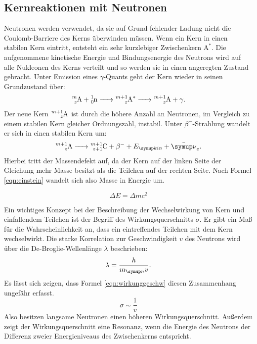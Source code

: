 \subsection{Kernreaktionen mit Neutronen}

Neutronen werden verwendet, da sie auf Grund fehlender Ladung nicht
die Coulomb-Barriere des Kerns überwinden müssen.
Wenn ein Kern in einen stabilen Kern eintritt, entsteht ein sehr kurzlebiger
Zwischenkern $\text{A}^*$. Die aufgenommene kinetische Energie und Bindungsenergie
des Neutrons wird auf alle Nukleonen des Kerns verteilt und so werden sie in
einen angeregten Zustand gebracht. Unter Emission eines $\gamma$-Quants
geht der Kern wieder in seinen Grundzustand über:
\begin{equation*}
  \ce{^{m}_zA + ^1_0n -> ^{m+1}_zA^* -> ^{m+1}_zA + \gamma}.
\end{equation*}
Der neue Kern $\ce{^{m+1}_zA}$ ist durch die höhere Anzahl an Neutronen, im Vergleich
zu einem stabilen Kern gleicher Ordnungszahl, instabil. Unter $\beta^-$-Strahlung
wandelt er sich in einen stabilen Kern um:
\begin{equation*}
  \ce{^{m+1}_zA -> ^{m+1}_{z+1}C + \beta^-} + E_{\g{kin}} + \bar{\g{\nu}}_e.
\end{equation*}
Hierbei tritt der Massendefekt auf, da der Kern auf der linken Seite der Gleichung
mehr Masse besitzt als die Teilchen auf der rechten Seite. Nach Formel \eqref{eqn:einstein}
wandelt sich also Masse in Energie um.

\begin{equation}
  \Delta E = \Delta m c^2
  \label{eqn:einstein}
\end{equation}

Ein wichtiges Konzept bei der Beschreibung der Wechselwirkung von Kern und
einfallendem Teilchen ist der Begriff des Wirkungsquerschnitts $\sigma$.
Er gibt ein Maß für die Wahrscheinlichkeit an, dass ein eintreffendes Teilchen
mit dem Kern wechselwirkt.
%
Die starke Korrelation
zur Geschwindigkeit $v$ des Neutrons wird über die De-Broglie-Wellenlänge $\lambda$
beschrieben:
\begin{equation*}
  \lambda = \frac{h}{m_{\g{n}} v}.
\end{equation*}
Es lässt sich zeigen, dass Formel \eqref{eqn:wirkunggeschw} diesen Zusammenhang
ungefähr erfasst.
\begin{equation}
  \sigma \sim \frac{1}{v}
  \label{eqn:wirkunggeschw}
\end{equation}
Also besitzen langsame Neutronen einen höheren Wirkungsquerschnitt.
Außerdem zeigt der Wirkungsquerschnitt eine Resonanz, wenn die Energie
des Neutrons der Differenz zweier Energieniveaus des Zwischenkerns entspricht.

